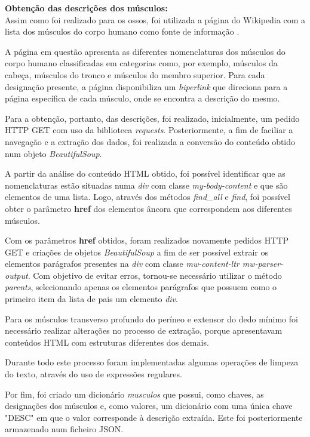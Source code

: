 \textbf{Obtenção das descrições dos músculos:}\\

Assim como foi realizado para os ossos, foi utilizada a página do Wikipedia com a lista dos músculos do corpo humano como fonte de informação \cite{wikipedia2024musculos}.

A página em questão apresenta as diferentes nomenclaturas dos músculos do corpo humano classificadas em categorias como, por exemplo, músculos da cabeça, músculos do tronco e músculos do membro superior. Para cada designação presente, a página disponibiliza um \textit{hiperlink} que direciona para a página específica de cada músculo, onde se encontra a descrição do mesmo.

Para a obtenção, portanto, das descrições, foi realizado, inicialmente, um pedido HTTP GET com uso da biblioteca \textit{requests}. Posteriormente, a fim de faciliar a navegação e a extração dos dados, foi realizada a conversão do conteúdo obtido num objeto \textit{BeautifulSoup}.

A partir da análise do conteúdo HTML obtido, foi possível identificar que as nomenclaturas estão situadas numa \textit{div} com classe \textit{my-body-content} e que são elementos de uma lista. Logo, através dos métodos \textit{find\_all} e \textit{find}, foi possível obter o parâmetro \textbf{href} dos elementos âncora que correspondem aos diferentes músculos. 

Com os parâmetros \textbf{href} obtidos, foram realizados novamente pedidos HTTP GET e criações de objetos \textit{BeautifulSoup} a fim de ser possível extrair os elementos parágrafos presentes na \textit{div} com classe \textit{mw-content-ltr mw-parser-output}. Com objetivo de evitar erros, tornou-se necessário utilizar o método \textit{parents}, selecionando apenas os elementos parágrafos que possuem como o primeiro item da lista de pais um elemento \textit{div}.

Para os músculos transverso profundo do períneo e extensor do dedo mínimo foi necessário realizar alterações no processo de extração, porque apresentavam conteúdos HTML com estruturas diferentes dos demais. 

Durante todo este processo foram implementadas algumas operações de limpeza do texto, através do uso de expressões regulares. 

Por fim, foi criado um dicionário \textit{musculos} que possui, como chaves, as designações dos músculos e, como valores, um dicionário com uma única chave "DESC" em que o valor corresponde à descrição extraída. Este foi posteriormente armazenado num ficheiro JSON.

